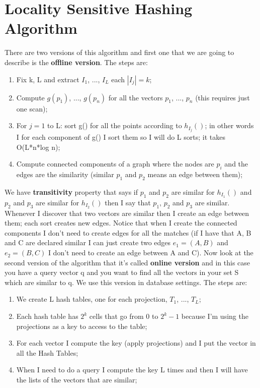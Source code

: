 \section{Locality Sensitive Hashing Algorithm}
There are two versions of this algorithm and first one that we are going to describe is the \textbf{offline version}.
The steps are:
\begin{enumerate}
    \item Fix k, L and extract $I_1$, ..., $I_L$ each $|I_j|=k$;
    \item Compute $g(p_1)$, ..., $g(p_n)$ for all the vectors $p_1$, ..., $p_n$ (this requires just one scan);
    \item For $j=1$ to L: sort g() for all the points according to $h_{I_j}()$; in other words I for each component of g() I sort them so I will do L sorts; it takes O(L*n*log n);
    \item Compute connected components of a graph where the nodes are $p_i$ and the edges are the similarity (similar $p_1$ and $p_2$ means an edge between them); 
\end{enumerate}
We have \textbf{transitivity} property that says if $p_1$ and $p_2$ are similar for $h_{I_1}()$ and $p_2$ and $p_3$ are similar for $h_{I_2}()$ then I say that $p_1$, $p_2$ and $p_3$ are similar.\newline
Whenever I discover that two vectors are similar then I create an edge between them; each sort creates new edges. Notice that when I create the connected components I don't need to create edges for all the matches (if I have that A, B and C are declared similar I can just create two edges $e_1=(A,B)$ and $e_2=(B,C)$ I don't need to create an edge between A and C).\newline
Now look at the second version of the algorithm that it's called \textbf{online version} and in this case you have a query vector q and you want to find all the vectors in your set S which are similar to q.\newline
We use this version in database settings.
The steps are:
\begin{enumerate}
    \item We create L hash tables, one for each projection, $T_1$, ..., $T_L$;
    \item Each hash table has $2^k$ cells that go from 0 to $2^k-1$ because I'm using the projections as a key to access to the table;
    \item For each vector I compute the key (apply projections) and I put the vector in all the Hash Tables;
    \item When I need to do a query I compute the key L times and then I will have the lists of the vectors that are similar;
\end{enumerate}
